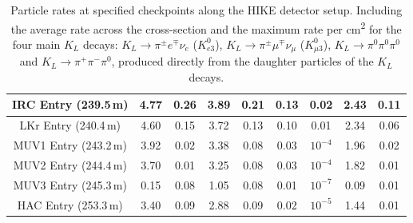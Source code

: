 \documentclass[../../main.tex]{subfiles}
\begin{document}
\begin{table}[htbp]
{\begin{tabular}{|c|clclclcl|}
            IRC Entry (239.5\,m) & \multicolumn{1}{c|}{4.77} & \multicolumn{1}{c|}{0.26} & \multicolumn{1}{c|}{3.89} & \multicolumn{1}{c|}{0.21} & \multicolumn{1}{c|}{0.13} & \multicolumn{1}{c|}{0.02} & \multicolumn{1}{c|}{2.43} & \multicolumn{1}{c|}{0.11}\\ \hline
            LKr Entry (240.4\,m) & \multicolumn{1}{c|}{4.60} & \multicolumn{1}{c|}{0.15} & \multicolumn{1}{c|}{3.72} & \multicolumn{1}{c|}{0.13} & \multicolumn{1}{c|}{0.10} & \multicolumn{1}{c|}{0.01} & \multicolumn{1}{c|}{2.34} & \multicolumn{1}{c|}{0.06}\\ \hline
            MUV1 Entry (243.2\,m) & \multicolumn{1}{c|}{3.92} & \multicolumn{1}{c|}{0.02} & \multicolumn{1}{c|}{3.38} & \multicolumn{1}{c|}{0.08} & \multicolumn{1}{c|}{0.03} & \multicolumn{1}{c|}{$10^{-4}$} & \multicolumn{1}{c|}{1.96} & \multicolumn{1}{c|}{0.02}\\ \hline
            MUV2 Entry (244.4\,m) & \multicolumn{1}{c|}{3.70} & \multicolumn{1}{c|}{0.01} & \multicolumn{1}{c|}{3.25} & \multicolumn{1}{c|}{0.08} & \multicolumn{1}{c|}{0.03} & \multicolumn{1}{c|}{$10^{-4}$} & \multicolumn{1}{c|}{1.82} & \multicolumn{1}{c|}{0.01}\\ \hline
            MUV3 Entry (245.3\,m) & \multicolumn{1}{c|}{0.15} & \multicolumn{1}{c|}{0.08} & \multicolumn{1}{c|}{1.05} & \multicolumn{1}{c|}{0.08} & \multicolumn{1}{c|}{0.01} & \multicolumn{1}{c|}{$10^{-7}$} & \multicolumn{1}{c|}{0.09} & \multicolumn{1}{c|}{0.01}\\ \hline
            HAC Entry (253.3\,m) & \multicolumn{1}{c|}{3.40} & \multicolumn{1}{c|}{0.09} & \multicolumn{1}{c|}{2.88} & \multicolumn{1}{c|}{0.09} & \multicolumn{1}{c|}{0.02} & \multicolumn{1}{c|}{$10^{-5}$} & \multicolumn{1}{c|}{1.44} & \multicolumn{1}{c|}{0.01}\\ \hline
            \end{tabular}
        }
        \caption{Particle rates at specified checkpoints along the HIKE detector setup. Including the average rate across the cross-section and the maximum rate per \si{\centi\metre\squared} for the four main $K_L$ decays: $ K_L \to \pi^{\pm} e^{\mp} \nu_e$ ($K_{e3}^{0}$), $ K_L \to \pi^{\pm} \mu^{\mp} \nu_{\mu}$ ($K_{\mu 3}^{0}$), $ K_L \to \pi^{0} \pi^{0} \pi^{0}$ and $ K_L \to \pi^{+} \pi^{-} \pi^{0}$, produced directly from the daughter particles of the $K_L$ decays.}%
        \label{tab:RatesAtZ}
    \end{table}
\end{document}
